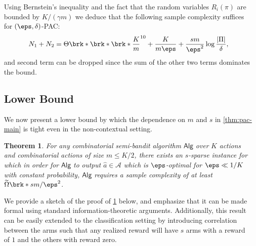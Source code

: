 \documentclass[11pt]{article}
\newcommand{\pred}{a}
\newcommand{\calA}{\mathcal{A}}
\theoremstyle{plain}
\newtheorem{theorem}{Theorem}
\begin{document}
Using Bernstein's inequality and the fact that the random variables $R_i(\pi)$ are bounded by $K / (\gamma m)$ we deduce that the following sample complexity suffices for $(\eps,\delta)$-PAC:
\begin{align*}
    N_1 + N_2 = \Theta \brk*{\brk*{\brk*{\frac{K}{m}}^{10} +  \frac{K}{m \eps} + \frac{sm}{\eps^2}} \log \frac{|\Pi|}{\delta}}, 
\end{align*}
and second term can be dropped since the sum of the other two terms dominates the bound.




\subsection{Lower Bound}
\label{sec:lower-bound}


We now present a lower bound by which the dependence on $m$ and $s$ in \cref{thm:pac-main} is tight even in the non-contextual setting. 

\begin{theorem}
\label{thm:lower-bound}
    For any combinatorial semi-bandit algorithm $\mathsf{Alg}$ over $K$ actions and combinatorial actions of size $m \leq K/2$, there exists an $s$-sparse instance for which in order for $\mathsf{Alg}$ to output $\hat \pred \in \calA$ which is $\eps$-optimal for $\eps \ll 1/K$ with constant probability, $\mathsf{Alg}$ requires a sample complexity of at least $\widetilde \Omega \brk*{sm/\eps^2}$.
\end{theorem}
We provide a sketch of the proof of \cref{thm:lower-bound} below, and emphasize that it can be made formal using standard information-theoretic arguments. Additionally, this result can be easily extended to the classification setting by introducing correlation between the arms such that any realized reward will have $s$ arms with a reward of $1$ and the others with reward zero.
\end{document}
